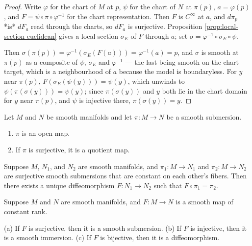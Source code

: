 \begin{proof}
\leanok
{}
Write $\varphi$ for the chart of $M$ at $p$, $\psi$ for the chart of $N$ at $\pi(p)$, $a = \varphi(p)$, and $F = \psi \circ \pi \circ \varphi^{-1}$ for the chart representation. Then $F$ is $C^\infty$ at $a$, and $d\pi_p$ *is* $dF_a$ read through the charts, so $dF_a$ is surjective. Proposition \ref{prop:local-section-euclidean} gives a local section $\sigma_E$ of $F$ through $a$; set $\sigma = \varphi^{-1} \circ \sigma_E \circ \psi$.

Then $\sigma(\pi(p)) = \varphi^{-1}(\sigma_E(F(a))) = \varphi^{-1}(a) = p$, and $\sigma$ is smooth at $\pi(p)$ as a composite of $\psi$, $\sigma_E$ and $\varphi^{-1}$ — the last being smooth on the chart target, which is a neighbourhood of $a$ because the model is boundaryless. For $y$ near $\pi(p)$, $F(\sigma_E(\psi(y))) = \psi(y)$, which unwinds to $\psi(\pi(\sigma(y))) = \psi(y)$; since $\pi(\sigma(y))$ and $y$ both lie in the chart domain for $y$ near $\pi(p)$, and $\psi$ is injective there, $\pi(\sigma(y)) = y$.
\end{proof}

\begin{proposition}
\label{prop:properties-of-submersions}
Let $M$ and $N$ be smooth manifolds and let $\pi: M \to N$ be a smooth submersion.
\begin{enumerate}[label=(\alph*)]
\item $\pi$ is an open map.
\item If $\pi$ is surjective, it is a quotient map.
\end{enumerate}
\end{proposition}

\begin{proposition}
\label{prop:uniqueness-smooth-quotients}
Suppose $M$, $N_1$, and $N_2$ are smooth manifolds, and $\pi_1 : M \to N_1$ and $\pi_2 : M \to N_2$ are surjective smooth submersions that are constant on each other's fibers. Then there exists a unique diffeomorphism $F : N_1 \to N_2$ such that $F \circ \pi_1 = \pi_2$.
\end{proposition}

\begin{theorem}
\label{thm:global-rank-theorem}
Suppose $M$ and $N$ are smooth manifolds, and $F : M \to N$ is a smooth map of constant rank.

(a) If $F$ is surjective, then it is a smooth submersion.
(b) If $F$ is injective, then it is a smooth immersion.
(c) If $F$ is bijective, then it is a diffeomorphism.
\end{theorem}

